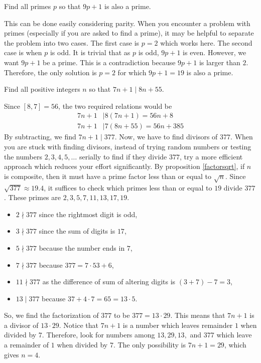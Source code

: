 	\begin{problem}
		Find all primes $p$ so that $9p+1$ is also a prime.
	\end{problem}

	\begin{solution}
		This can be done easily considering parity. When you encounter a problem with primes (especially if you are asked to find a prime), it may be helpful to separate the problem into two cases. The first case is $p=2$ which works here. The second case is when $p$ is odd. It is trivial that as $p$ is odd, $9p+1$ is even. However, we want $9p+1$ be a prime. This is a contradiction because $9p+1$ is larger than $2$. Therefore, the only solution is $p=2$ for which $9p+1=19$ is also a prime.
	\end{solution}

	\begin{problem}
		Find all positive integers $n$ so that $7n+1\mid 8n+55$.
	\end{problem}

	\begin{solution}
		Since $[8,7]=56$, the two required relations would be
			\begin{align*}
				7n+1 & \mid 8(7n+1)=56n+8\\
				7n+1 & \mid 7(8n+55)=56n+385
			\end{align*}
		By subtracting, we find $7n+1\mid 377$. Now, we have to find divisors of $377$. When you are stuck with finding divisors, instead of trying random numbers or testing the numbers $2,3,4,5,\ldots$ serially to find if they divide $377$, try a more efficient approach which reduces your effort significantly. By proposition \eqref{factorsqrt}, if $n$ is composite, then it must have a prime factor less than or equal to $\sqrt{n}$.  Since $\sqrt{377} \approx 19.4$, it suffices to check which primes less than or equal to $19$ divide $377$. These primes are $2,3,5,7,11,13,17,19$.
			\begin{itemize}
				\item $2 \nmid 377$ since the rightmost digit is odd,
				\item $3 \nmid 377$ since the sum of digits is $17$,
				\item $5 \nmid 377$ because the number ends in $7$,
				\item $7 \nmid 377$ because $377=7\cdot53+6$,
				\item $11 \nmid 377$ as the difference of sum of altering digits is $(3+7)-7=3$,
				\item $13 \mid 377$ because $37 + 4 \cdot 7 = 65 = 13 \cdot 5$.
			\end{itemize}
		So, we find the factorization of $377$ to be $377=13 \cdot 29$. This means that $7n+1$ is a divisor of $13 \cdot 29$. Notice that $7n+1$ is a number which leaves remainder $1$ when divided by $7$. Therefore, look for numbers among $13, 29, 13, $ and $377$ which leave a remainder of $1$ when divided by $7$. The only possibility is $7n+1=29$, which gives $n=4$.
	\end{solution}

